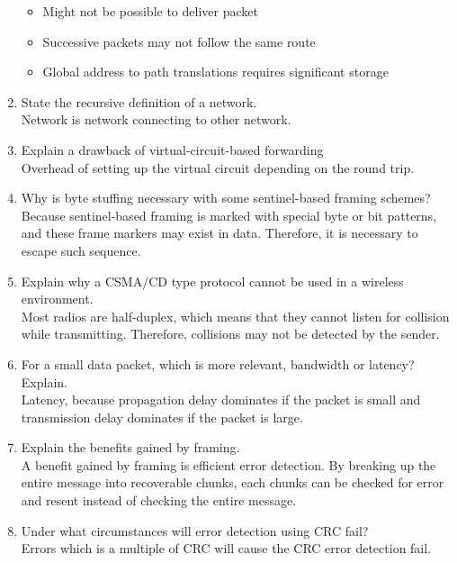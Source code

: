\documentclass[10pt, a4paper]{article}
\begin{document}
\begin{enumerate}
\begin{itemize}
    \item Might not be possible to deliver packet
    \item Successive packets may not follow the same route
    \item Global address to path translations requires significant storage
    \end{itemize}
    \color{black}
\item\mbox{}State the recursive definition of a network.\\
    \color{blue}
    Network is network connecting to other network.
    \color{black}
\item\mbox{}Explain a drawback of virtual-circuit-based forwarding\\
    \color{blue}
    Overhead of setting up the virtual circuit depending on the round trip.
    \color{black}
\item\mbox{}Why is byte stuffing necessary with some sentinel-based framing schemes?\\
    \color{blue}
    Because sentinel-based framing is marked with special byte or bit patterns, and these frame markers may exist in data. Therefore, it is necessary to escape such sequence.
    \color{black}
\item\mbox{}Explain why a CSMA/CD type protocol cannot be used in a wireless environment.\\
    \color{blue}
    Most radios are half-duplex, which means that they cannot listen for collision while transmitting. Therefore, collisions may not be detected by the sender.
    \color{black}
\item\mbox{}For a small data packet, which is more relevant, bandwidth or latency? Explain.\\
    \color{blue}
    Latency, because propagation delay dominates if the packet is small and transmission delay dominates if the packet is large.
    \color{black}
\item\mbox{}Explain the benefits gained by framing.\\
    \color{blue}
    A benefit gained by framing is efficient error detection. By breaking up the entire message into recoverable chunks, each chunks can be checked for error and resent instead of checking the entire message.
    \color{black}
\item\mbox{}Under what circumstances will error detection using CRC fail?\\
    \color{blue}
    Errors which is a multiple of CRC will cause the CRC error detection fail.

\end{enumerate}
\end{document}
